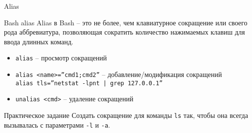 \begin{frame}{Alias}
  \begin{block}{Bash alias}
    Alias в Bash -- это не более, чем клавиатурное сокращение или своего рода аббревиатура, 
    позволяющая сократить количество нажимаемых клавиш для ввода длинных команд.

    \begin{itemize}
        \item {\tt alias} -- просмотр сокращений
	\item {\tt alias <name>=''cmd1;cmd2''} -- добавление/модификация сокращений \\
	      {\tt alias tls=''netstat -lpnt | grep 127.0.0.1''}
        \item {\tt unalias <cmd>} -- удаление сокращений
    \end{itemize}
  \end{block}

  \pause
  \begin{block}{Практическое задание}
  Создать сокращение для команды {\tt ls} так, чтобы она всегда вызывалась с параметрами {\tt -l} и {\tt -a}.
  \end{block}

\end{frame}
